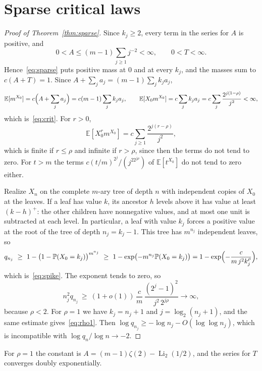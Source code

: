 \documentclass[11pt]{amsart}
\theoremstyle{remark}
\numberwithin{equation}{section}
\newcommand{\PP}{\mathbb{P}}
\newcommand{\EE}{\mathbb{E}}
\newcommand{\Li}{\operatorname{Li}}
\begin{document}
\section{Sparse critical laws}\label{sec:sparse}
\begin{proof}[Proof of Theorem~\ref{thm:sparse}]
Since $k_j\ge2$, every term in the series for $A$ is positive, and
\[
0<A\le(m-1)\sum_{j\ge1}j^{-2}<\infty,\qquad 0<T<\infty .
\]
Hence~\eqref{eq:sparse} puts positive mass at $0$ and at every $k_j$, and the masses sum to $c(A+T)=1$. Since $A+\sum_ja_j=(m-1)\sum_jk_ja_j$,
\[
\EE[m^{X_0}]=c\Bigl(A+\sum_ja_j\Bigr)=c(m-1)\sum_jk_ja_j,\qquad \EE[X_0m^{X_0}]=c\sum_jk_ja_j=c\sum_j\frac{2^{j(1-\rho)}}{j^2}<\infty,
\]
which is~\eqref{eq:crit}. For $r>0$,
\[
\EE[X_0^rm^{X_0}]=c\sum_{j\ge1}\frac{2^{j(r-\rho)}}{j^2},
\]
which is finite if $r\le\rho$ and infinite if $r>\rho$, since then the terms do not tend to zero. For $t>m$ the terms $c(t/m)^{2^j}/(j^22^{j\rho})$ of $\EE[t^{X_0}]$ do not tend to zero either.

Realize $X_n$ on the complete $m$-ary tree of depth $n$ with independent copies of $X_0$ at the leaves. If a leaf has value $k$, its ancestor $h$ levels above it has value at least $(k-h)^+$: the other children have nonnegative values, and at most one unit is subtracted at each level. In particular, a leaf with value $k_j$ forces a positive value at the root of the tree of depth $n_j=k_j-1$. This tree has $m^{n_j}$ independent leaves, so
\[
q_{n_j}\ \ge\ 1-\bigl(1-\PP(X_0=k_j)\bigr)^{m^{n_j}}\ \ge\ 1-\exp\bigl(-m^{n_j}\PP(X_0=k_j)\bigr)=1-\exp\Bigl(-\frac{c}{m\,j^2k_j^{\rho}}\Bigr),
\]
which is~\eqref{eq:spike}. The exponent tends to zero, so
\[
n_j^2q_{n_j}\ \ge\ (1+o(1))\,\frac cm\,\frac{(2^j-1)^2}{j^2\,2^{j\rho}}\to\infty,
\]
because $\rho<2$. For $\rho=1$ we have $k_j=n_j+1$ and $j=\log_2(n_j+1)$, and the same estimate gives~\eqref{eq:rho1}. Then $\log q_{n_j}\ge-\log n_j-O(\log\log n_j)$, which is incompatible with $\log q_n/\log n\to-2$.
\end{proof}

For $\rho=1$ the constant is $A=(m-1)\zeta(2)-\Li_2(1/2)$, and the series for $T$ converges doubly exponentially.
\end{document}
